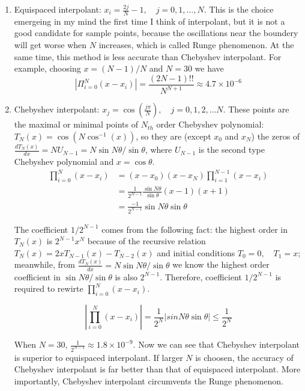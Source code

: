  \begin{enumerate}
  \item Equispaced interpolant: $x_{i}=\frac{2j}{N}-1,\quad j=0,1,\dots, N $. This is the choice
  emergeing in my mind the first time I think of interpolant, but it is not a good candidate for
  sample points, because the oscillations near the boundery will get worse
  when $N$ increases, which is called Runge phenomenon. At the same time, this method is less accurate
  than Chebyshev interpolant.
  For example, choosing $x=(N-1)/N$ and $N=30$ we have
  \[
   |\Pi_{i=0}^{N}(x-x_{i})|= \frac{(2N-1)!!}{N^{N+1}}\approx 4.7\times 10^{-6}
  \]


  \item Chebyshev interpolant: $x_{j}=\cos(\frac{j\pi}{N}), \quad j=0,1,2,\dots N$.
  These points are the maximal or minimal points of $N_{th}$ order Chebyshev polynomial:
  $T_{N}(x)=\cos(N\cos^{-1}(x))$, so they are (except $x_0$ and $x_N$)
  the zeros of $\frac{dT_{N}(x)}{dx}=NU_{N-1}=N\sin N\theta/\sin\theta$, where $U_{N-1}$
  is the second type Chebyshev polynomial and $x=\cos\theta$.
  \begin{align*}
   \prod_{i=0}^{N}(x-x_{i}) &=(x-x_0)(x-x_N)\prod_{i=1}^{N-1}(x-x_{i})\\
   &=\frac{1}{2^{N-1}}\frac{\sin N\theta}{\sin\theta}(x-1)(x+1)\\
   &=\frac{-1}{2^{N-1}}\sin N\theta \sin\theta
  \end{align*}

  The coefficient $1/2^{N-1}$ comes from the following fact: the highest order
  in $T_{N}(x)$ is $2^{N-1}x^{N}$ because of the recursive relation
  $T_{N}(x)=2xT_{N-1}(x)-T_{N-2}(x)$ and initial conditions $T_{0}=0,\quad T_{1}=x$;
  meanwhile, from $\frac{dT_{N}(x)}{dx}=N\sin N\theta/\sin\theta$ we know the highest order
  coefficient in  $\sin N\theta/\sin\theta$ is also $2^{N-1}$. Therefore, coefficient
  $1/2^{N-1}$ is required to rewirte $\prod_{i=0}^{N}(x-x_{i})$.

  \[
   |\prod_{i=0}^{N}(x-x_{i})|=\frac{1}{2^{N}} |sin N\theta \sin\theta| \leq \frac{1}{2^{N}}
  \]

  When $N=30$,  $\frac{1}{2^{N-1}}\approx 1.8\times 10^{-9}$. Now we can see that Chebyshev interpolant
  is superior to equispaced interpolant. If larger $N$ is choosen, the accuracy of Chebyshev interpolant
  is far better than that of equispaced interpolant. More importantly,
  Chebyshev interpolant circumvents the
  Runge phenomenon.


\end{enumerate}

